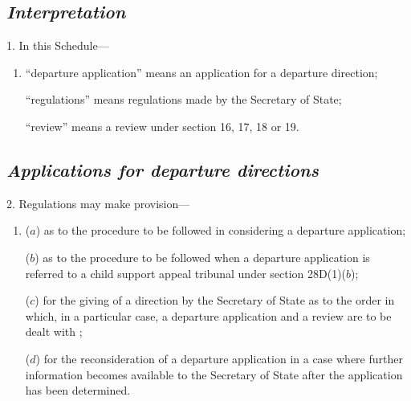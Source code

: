 \documentclass[12pt,a4paper]{article}
\begin{document}
\renewcommand\parthead{--- Schedule 4A}


\subsection*{\itshape Interpretation}

1. In this Schedule—
\begin{enumerate}\item[]
    “departure application” means an application for a departure direction;

    “regulations” means regulations made by the Secretary of State;

    “review” means a review under section 16, 17, 18 or 19. 
\end{enumerate}


\subsection*{\itshape Applications for departure directions}

2. Regulations may make provision—
\begin{enumerate}\item[]
($a$) as to the procedure to be followed in considering a departure application;

($b$) as to the procedure to be followed when a departure application is referred to 
a child support appeal tribunal 
under section 28D(1)($b$);

($c$) for the giving of a direction by the Secretary of State as to the order in which, in a particular case, 
a departure application and a review are to be dealt with%
;

($d$) for the reconsideration of a departure application in a case where further information becomes available to the Secretary of State after the application has been determined.
\end{enumerate}
\end{document}
